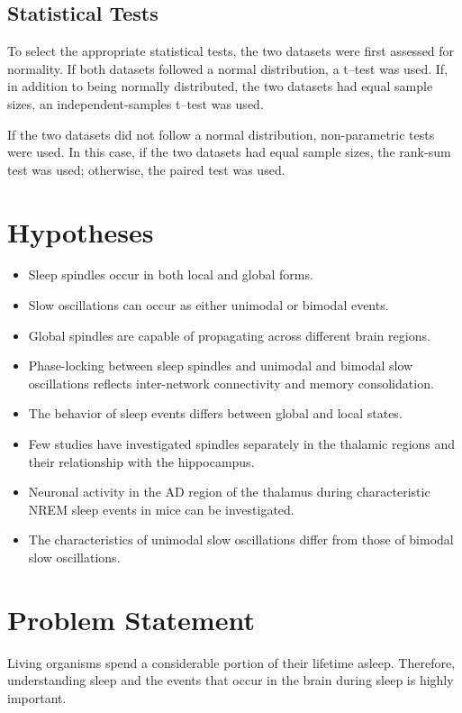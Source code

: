 \documentclass[12pt]{report}
\begin{document}
	\subsection{Statistical Tests}
	\label{Statistical Tests} 
	To select the appropriate statistical tests, the two datasets were first assessed for normality. If both datasets followed a normal distribution, a t--test was used. If, in addition to being normally distributed, the two datasets had equal sample sizes, an independent-samples t--test was used.
	
	If the two datasets did not follow a normal distribution, non-parametric tests were used. In this case, if the two datasets had equal sample sizes, the rank-sum test was used; otherwise, the paired test was used.
	
	\section{Hypotheses}
	\label{Hypotheses}
	\begin{itemize}
		\item Sleep spindles occur in both local and global forms.
		\item Slow oscillations can occur as either unimodal or bimodal events.
		\item Global spindles are capable of propagating across different brain regions.
		\item Phase-locking between sleep spindles and unimodal and bimodal slow oscillations reflects inter-network connectivity and memory consolidation.
		\item The behavior of sleep events differs between global and local states.
		\item Few studies have investigated spindles separately in the thalamic regions and their relationship with the hippocampus.
		\item Neuronal activity in the AD region of the thalamus during characteristic NREM sleep events in mice can be investigated.
		\item The characteristics of unimodal slow oscillations differ from those of bimodal slow oscillations.
	\end{itemize}
	\section{Problem Statement}
	\label{Problem Statement}
	Living organisms spend a considerable portion of their lifetime asleep. Therefore, understanding sleep and the events that occur in the brain during sleep is highly important.
	
\end{document}
